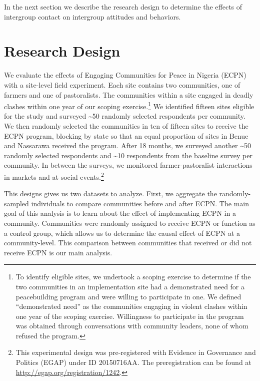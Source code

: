 \documentclass[11pt]{article}
\begin{document}
In the next section we describe the research design to determine the
effects of intergroup contact on intergroup attitudes and behaviors.

\hypertarget{research-design}{%
\section{Research Design}\label{research-design}}

We evaluate the effects of Engaging Communities for Peace in Nigeria
(ECPN) with a site-level field experiment. Each site contains two
communities, one of farmers and one of pastoralists. The communities
within a site engaged in deadly clashes within one year of our scoping
exercise.\footnote{To identify eligible sites, we undertook a scoping
  exercise to determine if the two communities in an implementation site
  had a demonstrated need for a peacebuilding program and were willing
  to participate in one. We defined ``demonstrated need'' as the
  communities engaging in violent clashes within one year of the scoping
  exercise. Willingness to participate in the program was obtained
  through conversations with community leaders, none of whom refused the
  program.} We identified fifteen sites eligible for the study and
surveyed \textasciitilde50 randomly selected respondents per community.
We then randomly selected the communities in ten of fifteen sites to
receive the ECPN program, blocking by state so that an equal proportion
of sites in Benue and Nassarawa received the program. After 18 months,
we surveyed another \textasciitilde50 randomly selected respondents and
\textasciitilde10 respondents from the baseline survey per community. In
between the surveys, we monitored farmer-pastoralist interactions in
markets and at social events.\footnote{This experimental design was
  pre-registered with Evidence in Governance and Politics (EGAP) under
  ID 20150716AA. The preregistration can be found at
  \url{http://egap.org/registration/1242}.}

This designs gives us two datasets to analyze. First, we aggregate the
randomly-sampled individuals to compare communities before and after
ECPN. The main goal of this analysis is to learn about the effect of
implementing ECPN in a community. Communities were randomly assigned to
receive ECPN or function as a control group, which allows us to
determine the causal effect of ECPN at a community-level. This
comparison between communities that received or did not receive ECPN is
our main analysis.
\end{document}
